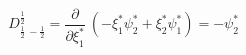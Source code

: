 \begin{equation}
D_{\frac{1}{2}~-\frac{1}{2}}^{\frac{1}{2}}= \frac{\partial}{\partial \xi_1^*}~(-\xi_1^* \psi_2^* +\xi_2^* \psi_1^*)=-\psi_2^* ~~~~~~~~~~~~~~~~~~~~~
\end{equation}

